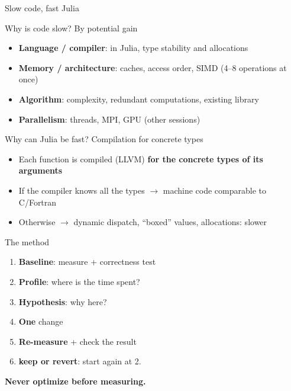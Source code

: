 \begin{frame}{Slow code, fast Julia}
    \begin{BlockBlue}{Why is code slow? By potential gain}
        \begin{itemize}%
            \item \textbf{Language / compiler}: in Julia, type stability and allocations
            \item \textbf{Memory / architecture}: caches, access order, SIMD (4--8 operations at once)
            \item \textbf{Algorithm}: complexity, redundant computations, existing library
            \item \textbf{Parallelism}: threads, MPI, GPU (other sessions)
        \end{itemize}
    \end{BlockBlue}

    \pause\smallskip

    \begin{BlockGreen}{Why can Julia be fast? Compilation for concrete types}
        \begin{itemize}%
            \item Each function is compiled (LLVM) \textbf{for the concrete types of its arguments}
            \item If the compiler knows all the types \( \to \) machine code comparable to C/Fortran
            \item Otherwise \( \to \) dynamic dispatch, ``boxed'' values, allocations: slower
        \end{itemize}
    \end{BlockGreen}
\end{frame}


\begin{frame}{The method}
    \begin{enumerate}
        \item \textbf{Baseline}: measure + correctness test
        \item \textbf{Profile}: where is the time spent?
        \item \textbf{Hypothesis}: why here?
        \item \textbf{One} change
        \item \textbf{Re-measure} + check the result
        \item \textbf{keep or revert}: start again at 2.
    \end{enumerate}

    \bigskip

    \alert{\textbf{Never optimize before measuring.}}
\end{frame}

